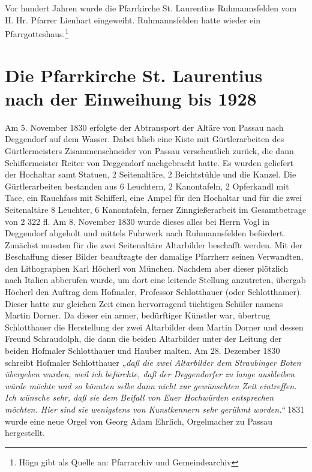 \documentclass[12pt,a4paper]{book}
\begin{document}
Vor hundert Jahren wurde die Pfarrkirche St. Laurentius Ruhmannsfelden
vom H. Hr. Pfarrer Lienhart eingeweiht. Ruhmannsfelden hatte wieder ein
Pfarrgotteshaus.\footnote{Högn gibt als Quelle an: Pfarrarchiv und
Gemeindearchiv}

\section[nach der Einweihung bis 1928]{Die Pfarrkirche St. Laurentius
nach der Einweihung bis
1928\protect\footnotemark{}\protect{}}

Am 5. November 1830 erfolgte der Abtransport der Altäre von Passau nach
Deggendorf auf dem Wasser. Dabei blieb eine Kiste mit Gürtlerarbeiten
des Gürtlermeisters Zisammenschneider von Passau versehentlich zurück,
die dann Schiffermeister Reiter von Deggendorf nachgebracht hatte. Es
wurden geliefert der Hochaltar samt Statuen, 2 Seitenaltäre, 2
Beichtstühle und die Kanzel. Die Gürtlerarbeiten bestanden aus 6
Leuchtern, 2 Kanontafeln, 2 Opferkandl mit Tace, ein Rauchfass mit
Schifferl, eine Ampel für den Hochaltar und für die zwei Seitenaltäre 8
Leuchter, 6 Kanontafeln, ferner Zinngießerarbeit im Gesamtbetrage von 2
322 fl. Am 8. November 1830 wurde dieses alles bei Herrn Vogl in
Deggendorf abgeholt und mittels Fuhrwerk nach Ruhmannsfelden befördert.
Zunächst mussten für die zwei Seitenaltäre Altarbilder beschafft werden.
Mit der Beschaffung dieser Bilder beauftragte der damalige Pfarrherr
seinen Verwandten, den Lithographen Karl Höcherl von München. Nachdem
aber dieser plötzlich nach Italien abberufen wurde, um dort eine
leitende Stellung anzutreten, übergab Höcherl den Auftrag dem Hofmaler,
Professor Schlotthauer (oder Schlotthamer). Dieser hatte zur gleichen
Zeit einen hervorragend tüchtigen Schüler namens Martin Dorner. Da
dieser ein armer, bedürftiger Künstler war, übertrug Schlotthauer die
Herstellung der zwei Altarbilder dem Martin Dorner und dessen Freund
Schraudolph, die dann die beiden Altarbilder unter der Leitung der
beiden Hofmaler Schlotthauer und Hauber malten. Am 28. Dezember 1830
schreibt Hofmaler Schlotthauer \emph{„daß die zwei Altarbilder dem
Straubinger Boten übergeben wurden, weil ich befürchte, daß der
Deggendorfer zu lange ausbleiben würde möchte und so könnten selbe dann
nicht zur gewünschten Zeit eintreffen. Ich wünsche sehr, daß sie dem
Beifall von Euer Hochwürden entsprechen möchten. Hier sind sie
wenigstens von Kunstkennern sehr gerühmt worden.“} 1831 wurde eine neue
Orgel von Georg Adam Ehrlich, Orgelmacher zu Passau hergestellt.
\end{document}
